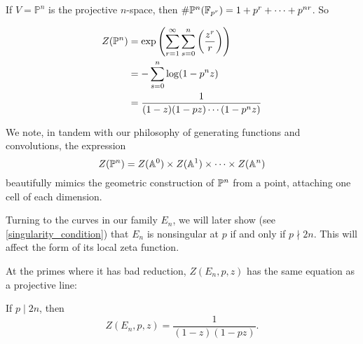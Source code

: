 \documentclass[12pt, a4paper]{report}
\begin{document}
\begin{example}
  If $V = \mathbb{P}^n$ is the projective $n$-space,
  then $\# {\mathbb P}^n(\mathbb{F}_{p^r})  
  = 1 + p^r + \cdots + p^{nr}$. So

  \begin{equation*}
    \begin{split}
      Z(\mathbb{{\mathbb P}}^n) &= \exp \left(  \sum\limits_{r=1}^\infty
        \sum\limits_{s=0}^{n} \left(  \frac{z^r}{r}  \right) \right) \\
      &= - \sum\limits_{s=0}^{n} \log (1 - p^n z) \\
      &= \frac{1}{(1-z) (1-pz) \cdots (1-p^{n} z)}
    \end{split}
  \end{equation*}
\end{example}

We note, in tandem with our philosophy of generating functions and convolutions,
the expression
\[Z({\mathbb P}^n) = Z(\mathbb{A}^0) \times Z(\mathbb{A}^1) \times \cdots \times Z(\mathbb{A}^n)\]
beautifully mimics the geometric construction of ${\mathbb P}^n$ from a point, attaching
one cell of each dimension. 

Turning to the curves in our family $E_n$, we will later show
(see \autoref{singularity_condition})
that $E_n$ is nonsingular at $p$ if and only if $p \nmid 2n$. This will affect
the form of its local zeta function.

At the primes where it has bad reduction, $Z(E_n,p,z)$ has the same equation as
a projective line:

\begin{prop}
  If $p \mid 2n$, then
  \[Z(E_n, p, z) = \frac{1}{(1-z)(1-pz)}.\]
\end{prop}
\end{document}
